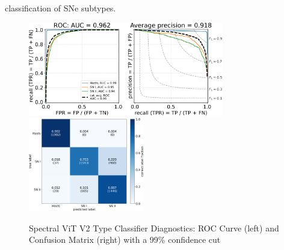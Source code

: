 classification of SNe subtypes.
\begin{figure}[t!]
    \centering
    \includegraphics[height=4.1cm]{figures/v2_applications/vit_model_V2roc99_type_e26.png}
    \quad
    \includegraphics[height=4.1cm]{figures/v2_applications/vit_model_V2cm99_type_e26.png}
    \caption[Spectral ViT V2 Type Classifier Diagnostics]{Spectral ViT V2 
    Type Classifier Diagnostics: ROC Curve (left) and Confusion Matrix (right) with a 99\% confidence
    cut\label{fig:v2_99_type_qual}}
\end{figure}




